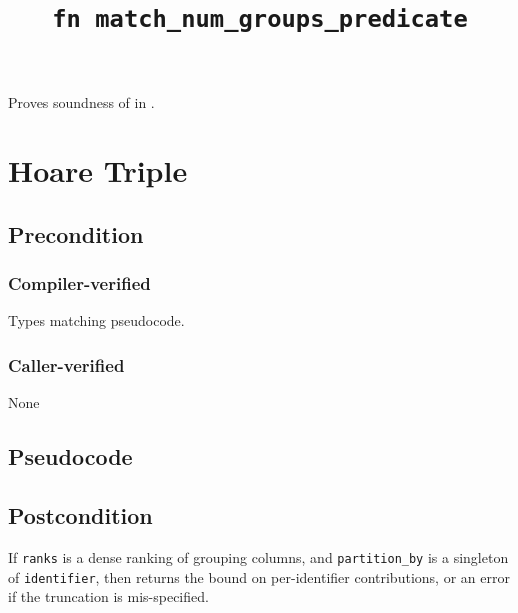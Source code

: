 \documentclass{article}
\title{\texttt{fn match\_num\_groups\_predicate}}
\author{\MichaelShoemateAuthor}
\begin{document}
\maketitle


\contrib

Proves soundness of 
in .

\section{Hoare Triple}
\subsection*{Precondition}
\subsubsection*{Compiler-verified}
Types matching pseudocode.

\subsubsection*{Caller-verified}
None

\subsection*{Pseudocode}
\label{sec:python-pseudocode}


\subsection*{Postcondition}
\begin{theorem}[Postcondition]
    If \texttt{ranks} is a dense ranking of grouping columns,
    and \texttt{partition\_by} is a singleton of \texttt{identifier},
    then returns the bound on per-identifier contributions,
    or an error if the truncation is mis-specified.
\end{theorem}
\end{document}
